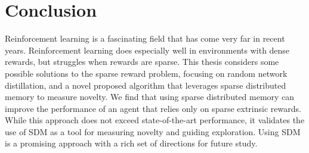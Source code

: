 \documentclass[journal, onecolumn, 12pt, draftclsnofoot]{IEEEtran}
\begin{document}
	\newpage
	\section{Conclusion}
	\label{sec:conclusion}
	\par Reinforcement learning is a fascinating field that has come very far in recent years. Reinforcement learning does especially well in environments with dense rewards, but struggles when rewards are sparse. This thesis considers some possible solutions to the sparse reward problem, focusing on random network distillation, and a novel proposed algorithm that leverages sparse distributed memory to measure novelty. We find that using sparse distributed memory can improve the performance of an agent that relies only on sparse extrinsic rewards. While this approach does not exceed state-of-the-art performance, it validates the use of SDM as a tool for measuring novelty and guiding exploration. Using SDM is a promising approach with a rich set of directions for future study.
	\newpage
	
	
\end{document}
